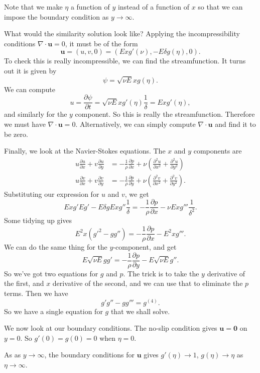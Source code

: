 \documentclass[a4paper]{article}
\begin{document}
\begin{eg}
  Note that we make $\eta$ a function of $y$ instead of a function of $x$ so that we can impose the boundary condition as $y \to \infty$.

  What would the similarity solution look like? Applying the incompressibility conditions $\nabla \cdot \mathbf{u} = 0$, it must be of the form
  \[
    \mathbf{u} = (u, v, 0) = (Ex g'(\nu), -E \delta g(\eta), 0).
  \]
  To check this is really incompressible, we can find the streamfunction. It turns out it is given by
  \[
    \psi = \sqrt{\nu E} x g(\eta).
  \]
  We can compute
  \[
    u = \frac{\partial \psi}{\partial t} = \sqrt{\nu E} x g'(\eta) \frac{1}{\delta} = Ex g'(\eta),
  \]
  and similarly for the $y$ component. So this is really the streamfunction. Therefore we must have $\nabla \cdot \mathbf{u} = 0$. Alternatively, we can simply compute $\nabla \cdot \mathbf{u}$ and find it to be zero.

  Finally, we look at the Navier-Stokes equations. The $x$ and $y$ components are
  \begin{align*}
    u \frac{\partial u}{\partial x} + v \frac{\partial u}{\partial y} &= -\frac{1}{\rho}\frac{\partial p}{\partial x} + \nu \left(\frac{\partial^2 u}{\partial x^2} + \frac{\partial^2 u}{\partial y^2}\right)\\
    u \frac{\partial v}{\partial x} + v \frac{\partial v}{\partial y} &= -\frac{1}{\rho}\frac{\partial p}{\partial y} + \nu \left(\frac{\partial^2 v}{\partial x^2} + \frac{\partial^2 v}{\partial y^2}\right).
  \end{align*}
  Substituting our expression for $u$ and $v$, we get
  \[
    Ex g'E g' - E \delta g E x g'' \frac{1}{\delta} = -\frac{1}{\rho} \frac{\partial p}{\partial x} - \nu E xg''' \frac{1}{\delta^2}.
  \]
  Some tidying up gives
  \[
    E^2 x(g'^2 - gg'') = -\frac{1}{\rho} \frac{\partial p}{\partial x} - E^2 x g'''.
  \]
  We can do the same thing for the $y$-component, and get
  \[
    E\sqrt{\nu E}gg' = -\frac{1}{\rho} \frac{\partial p}{\partial y} - E\sqrt{\nu E}g''.
  \]
  So we've got two equations for $g$ and $p$. The trick is to take the $y$ derivative of the first, and $x$ derivative of the second, and we can use that to eliminate the $p$ terms. Then we have
  \[
    g'g'' - gg''' = g^{(4)}.
  \]
  So we have a single equation for $g$ that we shall solve.

  We now look at our boundary conditions. The no-slip condition gives $\mathbf{u} = \mathbf{0}$ on $y = 0$. So $g'(0) = g(0) = 0$ when $\eta = 0$.

  As as $y \to \infty$, the boundary conditions for $\mathbf{u}$ gives $g'(\eta) \to 1$, $g(\eta) \to \eta$ as $\eta \to \infty$.


\end{eg}
\end{document}
